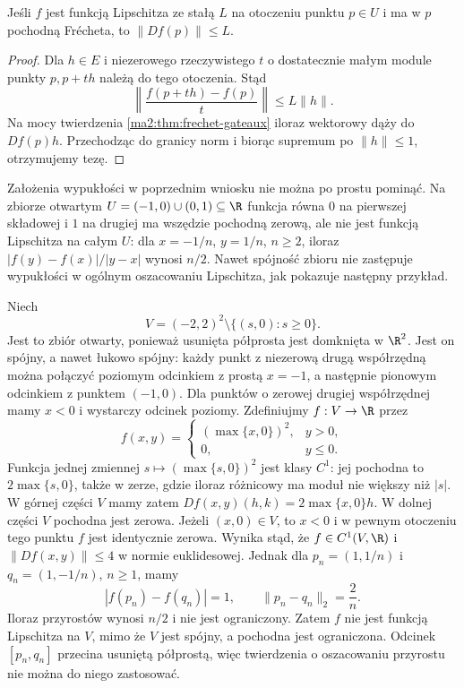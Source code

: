 \begin{stwierdzenie}
\label{ma2:prop:lipschitz-derivative}
Jeśli $f$ jest funkcją Lipschitza ze stałą $L$ na
otoczeniu punktu $p\in U$ i ma w $p$ pochodną
Frécheta, to $\|Df(p)\|\le L$.
\end{stwierdzenie}
\begin{proof}
Dla $h\in E$ i niezerowego rzeczywistego $t$ o
dostatecznie małym module punkty $p,p+th$ należą
do tego otoczenia. Stąd
\[
 \left\|\frac{f(p+th)-f(p)}{t}\right\|\le L\|h\|.
\]
Na mocy twierdzenia \ref{ma2:thm:frechet-gateaux}
iloraz wektorowy dąży do $Df(p)h$. Przechodząc
do granicy norm i biorąc supremum po $\|h\|\le1$,
otrzymujemy tezę.
\end{proof}

Założenia wypukłości w poprzednim wniosku nie można
po prostu pominąć. Na zbiorze otwartym
$U=(-1,0)\cup(0,1)\subseteq\R$ funkcja równa $0$
na pierwszej składowej i $1$ na drugiej ma wszędzie
pochodną zerową, ale nie jest funkcją Lipschitza na
całym $U$: dla $x=-1/n$, $y=1/n$, $n\ge2$,
iloraz $|f(y)-f(x)|/|y-x|$ wynosi $n/2$.
Nawet spójność zbioru nie zastępuje wypukłości
w ogólnym oszacowaniu Lipschitza, jak pokazuje
następny przykład.

\begin{przyklad}
\label{ma2:ex:connected-nonconvex-lipschitz}
Niech
\[
 V=(-2,2)^2\setminus\{(s,0):s\ge0\}.
\]
Jest to zbiór otwarty, ponieważ usunięta półprosta
jest domknięta w $\R^2$. Jest on spójny, a nawet
łukowo spójny: każdy punkt z niezerową drugą
współrzędną można połączyć poziomym odcinkiem
z prostą $x=-1$, a następnie pionowym odcinkiem
z punktem $(-1,0)$. Dla punktów o zerowej drugiej
współrzędnej mamy $x<0$ i wystarczy odcinek poziomy.
Zdefiniujmy $f:V\to\R$ przez
\[
 f(x,y)=
 \begin{cases}
  (\max\{x,0\})^2,&y>0,\\
  0,&y\le0.
 \end{cases}
\]
Funkcja jednej zmiennej $s\mapsto(\max\{s,0\})^2$
jest klasy $C^1$: jej pochodna to $2\max\{s,0\}$,
także w zerze, gdzie iloraz różnicowy ma moduł
nie większy niż $|s|$. W górnej części $V$ mamy
zatem $Df(x,y)(h,k)=2\max\{x,0\}h$.
W dolnej części $V$ pochodna jest zerowa.
Jeżeli $(x,0)\in V$, to $x<0$ i w pewnym
otoczeniu tego punktu $f$ jest identycznie zerowa.
Wynika stąd, że $f\in C^1(V,\R)$ i
$\|Df(x,y)\|\le4$ w normie euklidesowej.
Jednak dla $p_n=(1,1/n)$ i $q_n=(1,-1/n)$,
$n\ge1$, mamy
\[
 |f(p_n)-f(q_n)|=1,\qquad
 \|p_n-q_n\|_2=\frac2n.
\]
Iloraz przyrostów wynosi $n/2$ i nie jest ograniczony.
Zatem $f$ nie jest funkcją Lipschitza na $V$,
mimo że $V$ jest spójny, a pochodna jest ograniczona.
Odcinek $[p_n,q_n]$ przecina usuniętą półprostą,
więc twierdzenia o oszacowaniu przyrostu nie można
do niego zastosować.
\end{przyklad}

